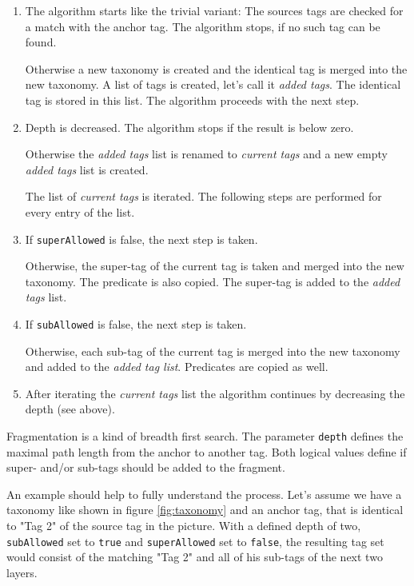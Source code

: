 \begin{enumerate}
    \item 
The algorithm starts like the trivial variant: The sources tags are checked for a match with the anchor tag. The algorithm stops, if no such tag can be found. 

Otherwise a new taxonomy is created and the identical tag is merged into the new taxonomy. A list of tags is created, let's call it {\it added tags}. The identical tag is stored in this list. The algorithm proceeds with the next step.

    \item 
Depth is decreased. The algorithm stops if the result is below zero.

Otherwise the {\it added tags} list is renamed to {\it current tags} and a new empty {\it added tags} list is created.

The list of {\it current tags} is iterated. The following steps are performed for every entry of the list.

    \item 
If {\tt superAllowed} is false, the next step is taken.

Otherwise, the super-tag of the current tag is taken and merged into the new taxonomy. The predicate is also copied. The super-tag is added to the {\it added tags} list.

    \item 
If {\tt subAllowed} is false, the next step is taken.

Otherwise, each sub-tag of the current tag is merged into the new taxonomy and added to the {\it added tag list}. Predicates are copied as well.

    \item 
After iterating the {\it current tags} list the algorithm continues by decreasing the depth (see above).

\end{enumerate}

Fragmentation is a kind of breadth first search. The parameter {\tt depth} defines the maximal path length from the anchor to another tag. Both logical values define if super- and/or sub-tags should be added to the fragment.

An example should help to fully understand the process. Let's assume we have a taxonomy like shown in figure \ref{fig:taxonomy} and an anchor tag, that is identical to "Tag 2" of the source tag in the picture. With a defined depth of two, {\tt subAllowed} set to {\tt true} and {\tt superAllowed} set to {\tt false}, the resulting tag set would consist of the matching "Tag 2" and all of his sub-tags of the next two layers.

